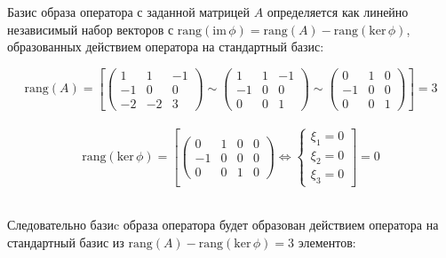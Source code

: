 \documentclass{article}
\newcommand{\im}{\text{im}\,}
\newcommand{\rang}{\text{rang}}
\renewcommand{\ker}{\text{ker}\,}
\begin{document}
\begin{center}
Базис образа оператора с заданной матрицей $A$ определяется как линейно независимый набор векторов с $\rang(\im\phi) = \rang(A) - \rang(\ker\phi)$, образованных действием оператора на стандартный базис:
\end{center}
\noindent$$\rang(A) = \left[\left(\begin{array}{rrr}
1 & 1 & -1 \\
-1 & 0 & 0 \\
-2 & -2 & 3
\end{array}\right) \sim \left(\begin{array}{rrr}
1 & 1 & -1 \\
-1 & 0 & 0 \\
0 & 0 & 1
\end{array}\right) \sim  \left(\begin{array}{rrr}
0 & 1 & 0 \\
-1 & 0 & 0 \\
0 & 0 & 1
\end{array}\right)\right] = 3$$ \\
\noindent$$\rang(\ker\phi) = \left[\left(\begin{array}{rrr|c}
0 & 1 & 0 & 0\\
-1 & 0 & 0 & 0 \\
0 & 0 & 1 & 0
\end{array}\right) \Leftrightarrow \begin{cases}
\xi_1 = 0 \\ \xi_2 = 0 \\ \xi_3 = 0
\end{cases}\right] = 0$$ \\
\begin{center}
Следовательно базиc образа оператора будет образован действием оператора на стандартный базис из $\rang(A) - \rang(\ker\phi) = 3$ элементов:
\end{center}
\end{document}
